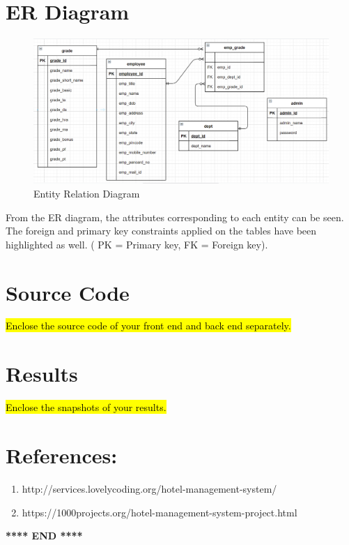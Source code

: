 \documentclass[12pt]{article}
\begin{document}
\newpage                %
\section{ER Diagram}    %

\begin{figure}[h!]
    \centering
    \includegraphics[width = \columnwidth]{er_diagram.png}
    \caption{Entity Relation Diagram}
    \label{fig:my_label}
\end{figure}
\noindent
From the ER diagram, the attributes corresponding to each entity can be seen. The foreign and primary key constraints applied on the tables have been highlighted as well. ( PK = Primary key, FK = Foreign key).


\newpage                            %
\section{Source Code}               %

\hl{Enclose the source code of your front end and back end separately.}

\newpage            %
\section{Results}   %

\hl{Enclose the snapshots of your results.}

\begin{figure}[h!]
    \centering
\end{figure}

\newpage
\section{References:}
\begin{enumerate}
    \item http://services.lovelycoding.org/hotel-management-system/
    \item https://1000projects.org/hotel-management-system-project.html
\end{enumerate}


\begin{center}
    \textbf{**** END ****}
\end{center}
\end{document}
